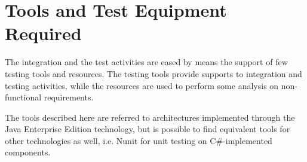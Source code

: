 \section{Tools and Test Equipment Required}

The integration and the test activities are eased by means the support of few testing tools and resources.
The testing tools provide supports to integration and testing activities, while the resources are used to perform some analysis on non-functional requirements.

The tools described here are referred to architectures implemented through the Java Enterprise Edition technology, but is possible to find equivalent tools for other technologies as well, i.e. Nunit for unit testing on C\#-implemented components.

	
	

